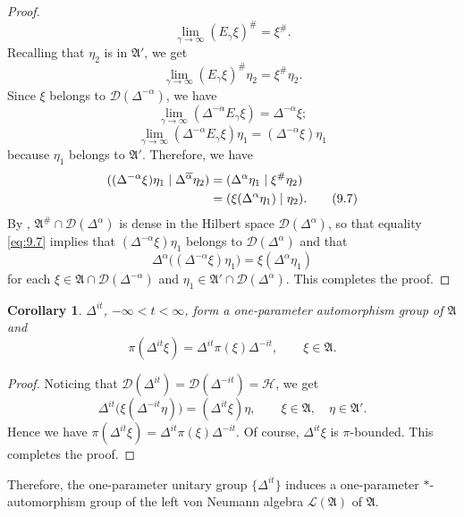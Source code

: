 \documentclass[12pt,b5paper,twoside]{article}
\theoremstyle{takesaki}
\newtheorem{corollary}{Corollary}[section]
\numberwithin{equation}{section}
\begin{document}
\begin{proof}
\[ \lim_{\gamma\to\infty}(E_\gamma\xi)^{\#}=\xi^{\#}.
\]
Recalling that $\eta_2$ is in $\mathfrak A'$, we get
\[
 \lim_{\gamma\to\infty}(E_\gamma\xi)^{\#}\eta_2
 =\xi^{\#}\eta_2.
\]
Since $\xi$ belongs to $\mathcal D(\Delta^{-\alpha})$, we have
\[
 \lim_{\gamma\to\infty}(\Delta^{-\alpha}E_\gamma\xi)
 =\Delta^{-\alpha}\xi;
\]
\[
 \lim_{\gamma\to\infty}(\Delta^{-\alpha}E_\gamma\xi)\eta_1
 =(\Delta^{-\alpha}\xi)\eta_1
\]
because $\eta_1$ belongs to $\mathfrak A'$.  Therefore, we have
\begin{align}
 ((\Delta^{-\alpha}\xi)\eta_1\mid
  \Delta^{\overline\alpha}\eta_2)
 &= (\Delta^\alpha\eta_1\mid\xi^{\#}\eta_2)\notag\\
 &= (\xi(\Delta^\alpha\eta_1)\mid\eta_2).
 \tag{9.7}\label{eq:9.7}
\end{align}
By ,
$\mathfrak A^{\#}\cap\mathcal D(\Delta^\alpha)$ is dense in the
Hilbert space $\mathcal D(\Delta^\alpha)$, so that equality
\eqref{eq:9.7} implies that $(\Delta^{-\alpha}\xi)\eta_1$ belongs to
$\mathcal D(\Delta^\alpha)$ and that
\[
 \Delta^\alpha\bigl((\Delta^{-\alpha}\xi)\eta_1\bigr)
 =\xi(\Delta^\alpha\eta_1)
\]
for each $\xi\in\mathfrak A\cap\mathcal D(\Delta^{-\alpha})$ and
$\eta_1\in\mathfrak A'\cap\mathcal D(\Delta^\alpha)$.  This completes
the proof.
\end{proof}

\begin{corollary}\label{cor:9.1}
$\Delta^{it}$, $-\infty<t<\infty$, form a one-parameter automorphism
group of $\mathfrak A$ and
\begin{equation}
 \pi(\Delta^{it}\xi)=\Delta^{it}\pi(\xi)\Delta^{-it},
 \qquad \xi\in\mathfrak A.
 \tag{9.8}\label{eq:9.8}
\end{equation}
\end{corollary}

\begin{proof}
Noticing that
$\mathcal D(\Delta^{it})=\mathcal D(\Delta^{-it})=\mathcal H$, we get
\[
 \Delta^{it}\bigl(\xi(\Delta^{-it}\eta)\bigr)
 =(\Delta^{it}\xi)\eta,
 \qquad \xi\in\mathfrak A,\quad\eta\in\mathfrak A'.
\]
Hence we have
$\pi(\Delta^{it}\xi)=\Delta^{it}\pi(\xi)\Delta^{-it}$.  Of course,
$\Delta^{it}\xi$ is $\pi$-bounded.  This completes the proof.
\end{proof}

Therefore, the one-parameter unitary group $\{\Delta^{it}\}$ induces
a one-parameter $*$-automorphism group of the left von Neumann algebra
$\mathcal L(\mathfrak A)$ of $\mathfrak A$.
\end{document}
